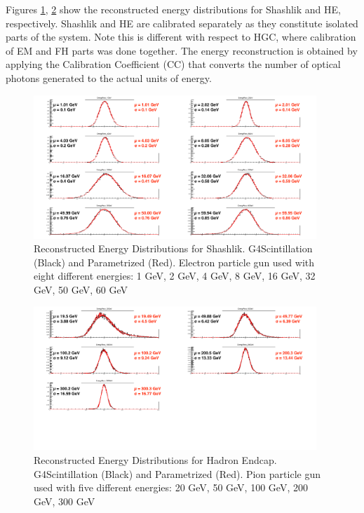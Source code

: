 Figures \ref{fig:simulations_shashlik_energyreco}, \ref{fig:simulations_he_energyreco} show the reconstructed energy distributions for Shashlik and HE, respectively. Shashlik and HE are calibrated separately as they constitute isolated parts of the system. Note this is different with respect to HGC, where calibration of EM and FH parts was done together. The energy reconstruction is obtained by applying the Calibration Coefficient (CC) that converts the number of optical photons generated to the actual units of energy.
\begin{figure}[hbtp]
    \centering
    \includegraphics[width=0.95\textwidth]{figures/ch_simulations/shashlik/performance/EnergyRecoDistributions.png}
    \caption{Reconstructed Energy Distributions for Shashlik. G4Scintillation (Black) and Parametrized (Red). Electron particle gun used with eight different energies: 1 GeV, 2 GeV, 4 GeV, 8 GeV, 16 GeV, 32 GeV, 50 GeV, 60 GeV}
    \label{fig:simulations_shashlik_energyreco}
 \end{figure}
 \begin{figure}[hbtp]
    \centering
    \includegraphics[width=0.95\textwidth]{figures/ch_simulations/he/performance/EnergyRECODistributions.png}
    \caption{Reconstructed Energy Distributions for Hadron Endcap. G4Scintillation (Black) and Parametrized (Red). Pion particle gun used with five different energies:  20 GeV, 50 GeV, 100 GeV, 200 GeV, 300 GeV}
    \label{fig:simulations_he_energyreco}
 \end{figure}


